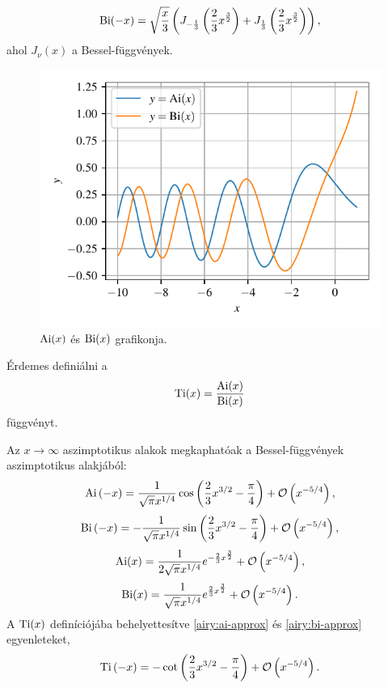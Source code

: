 \begin{equation}
	\operatorname{Bi}(-x) = \sqrt{\frac{x}{3}}\left(J_{-\frac{1}{3}}\left(\frac{2}{3}x^{\frac{3}{2}}\right)+J_{\frac{1}{3}}\left(\frac{2}{3}x^{\frac{3}{2}}\right)\right),
	\label{airy:bi-}
\end{equation}
ahol $J_\nu(x)$ a Bessel-függvények.
\begin{figure}
	\centering
	\includegraphics[scale=1]{./figs/airy.pdf}
	\caption[Airy-függvények]{$\operatorname{Ai}(x)$ és $\operatorname{Bi}(x)$ grafikonja.}
\end{figure}
Érdemes definiálni a
\begin{equation}
	\operatorname{Ti}(x) = \frac{\operatorname{Ai}(x)}{\operatorname{Bi}(x)}
\end{equation}
függvényt.

Az $x \to \infty$ aszimptotikus alakok megkaphatóak a Bessel-függvények aszimptotikus alakjából: 
\begin{equation}
	\operatorname{Ai}\left(-x\right) = \frac{1}{\sqrt{\pi}x^{1/4}}\cos\left(\frac{2}{3}x^{3/2} - \frac{\pi}{4}\right) + \mathcal{O}\left(x^{-5/4}\right),
	\label{airy:ai-approx}
\end{equation}
\begin{equation}
	\operatorname{Bi}\left(-x\right) = -\frac{1}{\sqrt{\pi}x^{1/4}}\sin\left(\frac{2}{3}x^{3/2} - \frac{\pi}{4}\right) + \mathcal{O}\left(x^{-5/4}\right),
	\label{airy:bi-approx}
\end{equation}
\begin{equation}
	\operatorname{Ai}(x) = \frac{1}{2\sqrt{\pi}x^{1/4}}e^{-\frac{2}{3}x^{\frac{3}{2}}}+\mathcal{O}\left(x^{-5/4}\right),
	\label{airy:ai+approx}
\end{equation}
\begin{equation}
	\operatorname{Bi}(x) = \frac{1}{ \sqrt{\pi}x^{1/4}}e^{ \frac{2}{3}x^{\frac{3}{2}}}+\mathcal{O}\left(x^{-5/4}\right).
	\label{airy:bi+approx}
\end{equation}
A $\operatorname{Ti}(x)$ definíciójába behelyettesítve \eqref{airy:ai-approx} és \eqref{airy:bi-approx} egyenleteket,
\begin{equation}
	\operatorname{Ti}\left(-x\right) = -\cot\left( \frac{2}{3}x^{3/2} - \frac{\pi}{4} \right) + \mathcal{O}\left(x^{-5/4}\right).
	\label{airy:tiapprox}
\end{equation}

